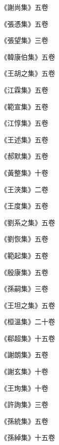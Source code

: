 \begin{pinyinscope}
 《謝尚集》五卷



 《張憑集》五卷



 《張望集》三卷



 《韓康伯集》五卷



 《王胡之集》五卷



 《江霖集》五卷



 《範宣集》五卷



 《江惇集》五卷



 《王述集》五卷



 《郝默集》五卷



 《黃整集》十卷



 《王浹集》二卷



 《王度集》五卷



 《劉系之集》五卷



 《劉恢集》五卷



 《範起集》五卷



 《殷康集》五卷



 《孫嗣集》三卷



 《王坦之集》五卷



 《桓溫集》二十卷



 《郗超集》十五卷



 《謝朗集》五卷



 《謝玄集》十卷



 《王珣集》十卷



 《許詢集》三卷



 《孫統集》五卷



 《孫綽集》十五卷




\end{pinyinscope}
